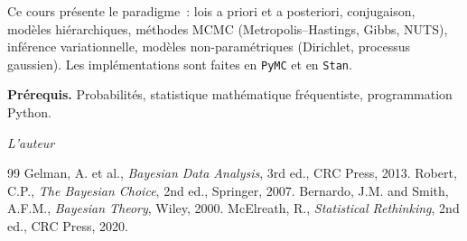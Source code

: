 \documentclass[12pt,a4paper,twoside]{book}
\theoremstyle{definition}
\theoremstyle{plain}
\theoremstyle{remark}
\begin{document}
Ce cours pr\'esente le paradigme~: lois a priori et a posteriori, conjugaison, mod\`eles hi\'erarchiques, m\'ethodes MCMC (Metropolis--Hastings, Gibbs, NUTS), inf\'erence variationnelle, mod\`eles non-param\'etriques (Dirichlet, processus gaussien). Les impl\'ementations sont faites en \texttt{PyMC} et en \texttt{Stan}.

\medskip

\noindent\textbf{Pr\'erequis.} Probabilit\'es, statistique math\'ematique fr\'equentiste, programmation Python.

\vfill
\hfill\textit{L'auteur}


\mainmatter














\backmatter
\begin{thebibliography}{99}
 Gelman, A. et al., \emph{Bayesian Data Analysis}, 3rd ed., CRC Press, 2013.
 Robert, C.P., \emph{The Bayesian Choice}, 2nd ed., Springer, 2007.
 Bernardo, J.M. and Smith, A.F.M., \emph{Bayesian Theory}, Wiley, 2000.
 McElreath, R., \emph{Statistical Rethinking}, 2nd ed., CRC Press, 2020.
\end{thebibliography}
\printindex
\end{document}
